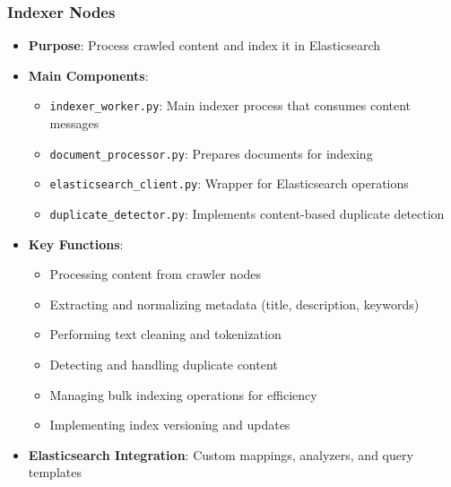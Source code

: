 \documentclass[12pt,a4paper]{report}
\begin{document}
\subsubsection{Indexer Nodes}
\begin{itemize}
    \item \textbf{Purpose}: Process crawled content and index it in Elasticsearch
    \item \textbf{Main Components}:
    \begin{itemize}
        \item \texttt{indexer\_worker.py}: Main indexer process that consumes content messages
        \item \texttt{document\_processor.py}: Prepares documents for indexing
        \item \texttt{elasticsearch\_client.py}: Wrapper for Elasticsearch operations
        \item \texttt{duplicate\_detector.py}: Implements content-based duplicate detection
    \end{itemize}
    \item \textbf{Key Functions}:
    \begin{itemize}
        \item Processing content from crawler nodes
        \item Extracting and normalizing metadata (title, description, keywords)
        \item Performing text cleaning and tokenization
        \item Detecting and handling duplicate content
        \item Managing bulk indexing operations for efficiency
        \item Implementing index versioning and updates
    \end{itemize}
    \item \textbf{Elasticsearch Integration}: Custom mappings, analyzers, and query templates
\end{itemize}
\end{document}
